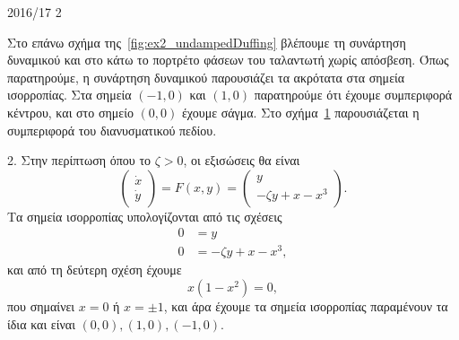 \begin{solution}{2016/17 2}
\begin{figure}[h]
        \caption{}
        \label{fig:ex2_undampedDuffingVectorField}
    \end{figure}
    Στο επάνω σχήμα της~\ref{fig:ex2_undampedDuffing} βλέπουμε τη συνάρτηση
    δυναμικού και στο κάτω το πορτρέτο φάσεων του ταλαντωτή  χωρίς
    απόσβεση. Όπως παρατηρούμε, η συνάρτηση δυναμικού παρουσιάζει τα ακρότατα
    στα σημεία ισορροπίας. Στα σημεία \( (-1, 0) \) και \( (1, 0) \) παρατηρούμε
    ότι έχουμε συμπεριφορά κέντρου, και στο σημείο \( (0, 0) \) έχουμε σάγμα.
    Στο σχήμα~\ref{fig:ex2_undampedDuffingVectorField} παρουσιάζεται η
    συμπεριφορά του διανυσματικού πεδίου.

    2. Στην περίπτωση όπου το \( \zeta > 0 \), οι εξισώσεις θα είναι
    \begin{equation*}
        \begin{pmatrix}
            \dot{x} \\
            \dot{y}
        \end{pmatrix} = F(x, y) =
        \begin{pmatrix}
            y \\
            -\zeta y + x - x^3
        \end{pmatrix}.
    \end{equation*}
    Τα σημεία ισορροπίας υπολογίζονται από τις σχέσεις
    \begin{align*}
        0 &= y \\
        0 &= -\zeta y + x - x^3,
    \end{align*}
    και από τη δεύτερη σχέση έχουμε
    \begin{equation*}
        x(1 - x^2) = 0,
    \end{equation*}
    που σημαίνει \( x = 0 \) ή \( x = \pm 1 \), και άρα έχουμε τα σημεία
    ισορροπίας παραμένουν τα ίδια και είναι \( (0, 0), (1, 0), (-1, 0) \).


\end{solution}
